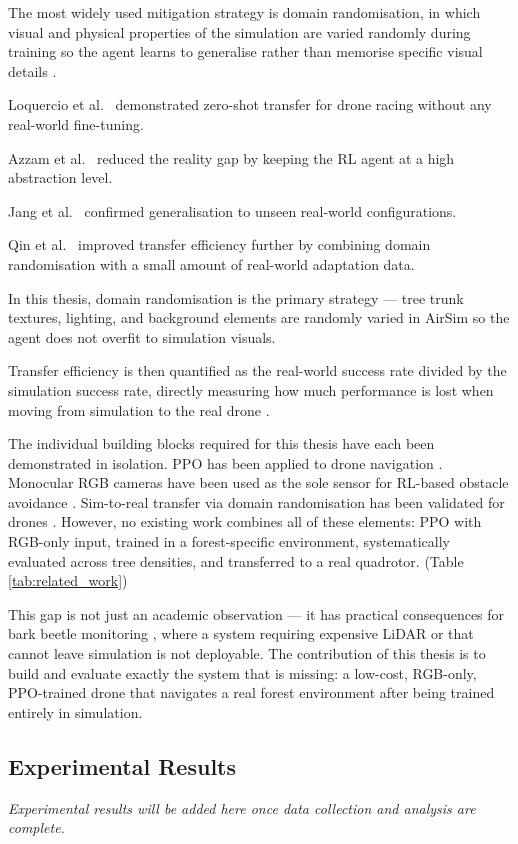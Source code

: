\documentclass[../main.tex]{subfiles}
\begin{document}
The most widely used mitigation strategy is domain randomisation, in which visual and physical properties of the simulation are varied randomly during training so the agent learns to generalise rather than memorise specific visual details \cite{Zhao2020,Salvato2021,Loquercio2019,Jang2024}.

Loquercio et al.\ \cite{Loquercio2019} demonstrated zero-shot transfer for drone racing without any real-world fine-tuning.

Azzam et al.\ \cite{Azzam2024} reduced the reality gap by keeping the RL agent at a high abstraction level.

Jang et al.\ \cite{Jang2024} confirmed generalisation to unseen real-world configurations.

Qin et al.\ \cite{Qin2025} improved transfer efficiency further by combining domain randomisation with a small amount of real-world adaptation data.

In this thesis, domain randomisation is the primary strategy \cite{Zhao2020,Salvato2021,Loquercio2019} --- tree trunk textures, lighting, and background elements are randomly varied in AirSim so the agent does not overfit to simulation visuals.

Transfer efficiency is then quantified as the real-world success rate divided by the simulation success rate, directly measuring how much performance is lost when moving from simulation to the real drone \cite{Zhao2020,Salvato2021}.

The individual building blocks required for this thesis have each been demonstrated in isolation. PPO has been applied to drone navigation \cite{Khanzada2025,Vizzotto2025,Tayar2025}. Monocular RGB cameras have been used as the sole sensor for RL-based obstacle avoidance \cite{Kumar2023,Kalidas2023,Kabas2022}. Sim-to-real transfer via domain randomisation has been validated for drones \cite{Loquercio2019,Azzam2024,Jang2024}. However, no existing work combines all of these elements: PPO with RGB-only input, trained in a forest-specific environment, systematically evaluated across tree densities, and transferred to a real quadrotor. (Table \ref{tab:related_work})



This gap is not just an academic observation --- it has practical consequences for bark beetle monitoring \cite{Bozzini2024,Bijou2025}, where a system requiring expensive LiDAR or that cannot leave simulation is not deployable. The contribution of this thesis is to build and evaluate exactly the system that is missing: a low-cost, RGB-only, PPO-trained drone that navigates a real forest environment after being trained entirely in simulation.

\subsection{Experimental Results}

\textit{Experimental results will be added here once data collection and analysis are complete.}
\end{document}
